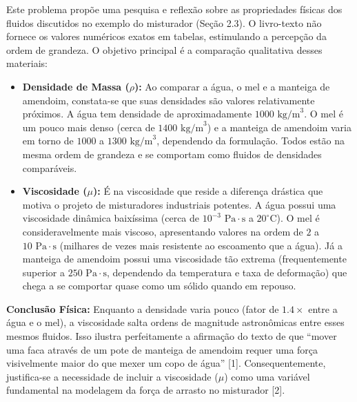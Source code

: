 Este problema propõe uma pesquisa e reflexão sobre as propriedades físicas dos fluidos discutidos no exemplo do misturador (Seção 2.3). O livro-texto não fornece os valores numéricos exatos em tabelas, estimulando a percepção da ordem de grandeza. O objetivo principal é a comparação qualitativa desses materiais:

\begin{itemize}
    \item \textbf{Densidade de Massa ($\rho$):} Ao comparar a água, o mel e a manteiga de amendoim, constata-se que suas densidades são valores relativamente próximos. A água tem densidade de aproximadamente $1000 \text{ kg/m}^3$. O mel é um pouco mais denso (cerca de $1400 \text{ kg/m}^3$) e a manteiga de amendoim varia em torno de $1000$ a $1300 \text{ kg/m}^3$, dependendo da formulação. Todos estão na mesma ordem de grandeza e se comportam como fluidos de densidades comparáveis.
    
    \item \textbf{Viscosidade ($\mu$):} É na viscosidade que reside a diferença drástica que motiva o projeto de misturadores industriais potentes. A água possui uma viscosidade dinâmica baixíssima (cerca de $10^{-3} \text{ Pa}\cdot\text{s}$ a $20^\circ\text{C}$). O mel é consideravelmente mais viscoso, apresentando valores na ordem de $2$ a $10 \text{ Pa}\cdot\text{s}$ (milhares de vezes mais resistente ao escoamento que a água). Já a manteiga de amendoim possui uma viscosidade tão extrema (frequentemente superior a $250 \text{ Pa}\cdot\text{s}$, dependendo da temperatura e taxa de deformação) que chega a se comportar quase como um sólido quando em repouso.
\end{itemize}

\textbf{Conclusão Física:} Enquanto a densidade varia pouco (fator de $1.4\times$ entre a água e o mel), a viscosidade salta ordens de magnitude astronômicas entre esses mesmos fluidos. Isso ilustra perfeitamente a afirmação do texto de que ``mover uma faca através de um pote de manteiga de amendoim requer uma força visivelmente maior do que mexer um copo de água'' [1]. Consequentemente, justifica-se a necessidade de incluir a viscosidade ($\mu$) como uma variável fundamental na modelagem da força de arrasto no misturador [2].

